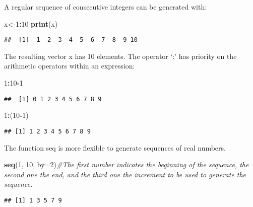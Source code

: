 \documentclass[]{book}
\newenvironment{Shaded}{\begin{snugshade}}{\end{snugshade}}
\newcommand{\KeywordTok}[1]{\textcolor[rgb]{0.13,0.29,0.53}{\textbf{#1}}}
\newcommand{\DataTypeTok}[1]{\textcolor[rgb]{0.13,0.29,0.53}{#1}}
\newcommand{\DecValTok}[1]{\textcolor[rgb]{0.00,0.00,0.81}{#1}}
\newcommand{\CommentTok}[1]{\textcolor[rgb]{0.56,0.35,0.01}{\textit{#1}}}
\newcommand{\OperatorTok}[1]{\textcolor[rgb]{0.81,0.36,0.00}{\textbf{#1}}}
\newcommand{\NormalTok}[1]{#1}
\theoremstyle{definition}
\theoremstyle{definition}
\theoremstyle{definition}
\theoremstyle{remark}
\begin{document}
A regular sequence of consecutive integers can be generated with:

\begin{Shaded}
\begin{Highlighting}[]
\NormalTok{x<-}\DecValTok{1}\OperatorTok{:}\DecValTok{10}
\KeywordTok{print}\NormalTok{(x)}
\end{Highlighting}
\end{Shaded}

\begin{verbatim}
##  [1]  1  2  3  4  5  6  7  8  9 10
\end{verbatim}

The resulting vector x has 10 elements. The operator `:' has priority on
the arithmetic operators within an expression:

\begin{Shaded}
\begin{Highlighting}[]
\DecValTok{1}\OperatorTok{:}\DecValTok{10}\OperatorTok{-}\DecValTok{1}
\end{Highlighting}
\end{Shaded}

\begin{verbatim}
##  [1] 0 1 2 3 4 5 6 7 8 9
\end{verbatim}

\begin{Shaded}
\begin{Highlighting}[]
\DecValTok{1}\OperatorTok{:}\NormalTok{(}\DecValTok{10}\OperatorTok{-}\DecValTok{1}\NormalTok{)}
\end{Highlighting}
\end{Shaded}

\begin{verbatim}
## [1] 1 2 3 4 5 6 7 8 9
\end{verbatim}

The function seq is more flexible to generate sequences of real numbers.

\begin{Shaded}
\begin{Highlighting}[]
\KeywordTok{seq}\NormalTok{(}\DecValTok{1}\NormalTok{, }\DecValTok{10}\NormalTok{, }\DataTypeTok{by=}\DecValTok{2}\NormalTok{)}\CommentTok{#The first number indicates the beginning of the sequence, the second one the end, and the third one the increment to be used to generate the sequence. }
\end{Highlighting}
\end{Shaded}

\begin{verbatim}
## [1] 1 3 5 7 9
\end{verbatim}
\end{document}
